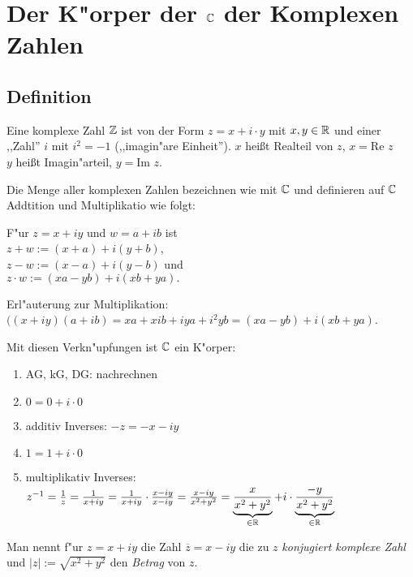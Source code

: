 \section{Der K"orper der $\mathbb{C}$ der Komplexen Zahlen} 

\subsection{Definition}
Eine komplexe Zahl $\mathbb{Z}$ ist von der Form $z=x+i\cdot y$ mit $x, y \in \mathbb{R}$ und einer ,,Zahl'' $i$ mit $i^2=-1$ (,,imagin"are Einheit''). $x$ heißt Realteil von $z$, $x=$Re $z$\\
$y$ heißt Imagin"arteil, $y=$Im $z$.

Die Menge aller komplexen Zahlen bezeichnen wie mit $\mathbb{C}$ und definieren auf $\mathbb{C}$ Addtition und Multiplikatio wie folgt:

F"ur $z=x+iy$ und $w=a+ib$ ist \\$z+w:= (x+a) + i (y+b)$, \\$z-w:= (x-a) + i (y-b)$ und \\$z\cdot w:= (xa-yb) + i(xb+ya).$

Erl"auterung zur Multiplikation: $((x+iy)(a+ib) = xa + xib + iya + i^2yb = (xa-yb) + i(xb+ya)$.

Mit diesen Verkn"upfungen ist $\mathbb{C}$ ein K"orper:
\begin{enumerate}
	\item
	AG, kG, DG: nachrechnen
	\item
	$0=0+i\cdot 0$
	\item
	additiv Inverses: $-z = -x-iy$
	\item
	$1=1+i\cdot 0$
	\item
	multiplikativ Inverses: $z^{-1}= \frac{1}{z}= \frac{1}{x+iy}=\frac{1}{x+iy}\cdot\frac{x-iy}{x-iy}= \frac{x-iy}{x^2+y^2}=\underbrace{\frac{x}{x^2+y^2}}_{\in \mathbb{R}}+ i \cdot \underbrace{\frac{-y}{x^2+y^2}}_{\in \mathbb{R}}$
\end{enumerate}
	Man nennt f"ur $z=x+iy$ die Zahl $ \overline{z} = x-iy$ die zu $z$ \emph{konjugiert komplexe Zahl} und $|z| := \sqrt{x^2+y^2}$ den \emph{Betrag} von $z$.

